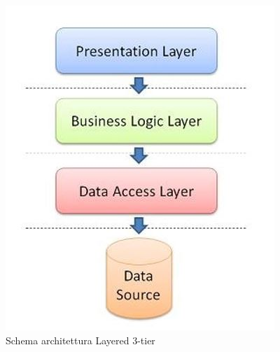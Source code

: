 \begin{figure}[h]
	\centering
	\includegraphics[scale=0.7]{immagini/layered_architecture}
	\caption{Schema architettura Layered 3-tier}
	\label{img:layeredArch}
\end{figure}
